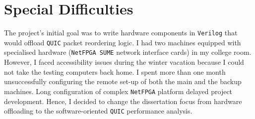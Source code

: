 \documentclass[12pt,a4paper]{report}
\begin{document}
\section*{Special Difficulties}

The project's initial goal was to write hardware components in \texttt{Verilog} that would offload \texttt{QUIC} packet reordering logic.
I had two machines equipped with specialised hardware (\texttt{NetFPGA SUME} network interface cards) in my college room.
However, I faced accessibility issues during the winter vacation because I could not take the testing computers back home.
I spent more than one month unsuccessfully configuring the remote set-up of both the main and the backup machines.
Long configuration of complex  \texttt{NetFPGA} platform delayed project development.
Hence, I decided to change the dissertation focus from hardware offloading to the software-oriented \texttt{QUIC} performance analysis. 



\end{document}
